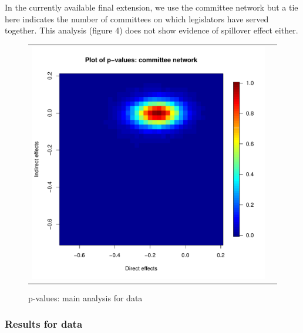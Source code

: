 \documentclass[12pt]{article}
\begin{document}
In the currently available final extension, we use the committee network but a tie here indicates the number of committees on which legislators have served together. This analysis (figure 4) does not show evidence of spillover effect either.
\begin{figure}
	\centering
	\begin{tabular}{cc}
	\includegraphics[scale=0.5]{./images/pvalues_figure_committee_Coppock.pdf}
	\end{tabular}
	\caption{p-values: main analysis for \citet{butler2011can} data}
\end{figure}




\subsubsection{Results for \citet{bergan2015call} data}
\end{document}
